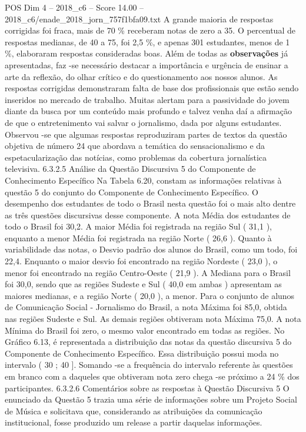 \begin{textsample}{POS Dim 4 – 2018\_c6 – Score 14.00 – 2018\_c6/enade\_2018\_jorn\_757f1bfa09.txt}
A grande maioria de respostas corrigidas foi fraca, mais de 70 \% receberam notas de zero a 35.
O percentual de respostas medianas, de 40 a 75, foi 2,5 \%, e apenas 301 estudantes, menos de 1 \%, elaboraram respostas consideradas boas.
Além de todas as \textbf{observações} já apresentadas, faz -se necessário destacar a importância e urgência de ensinar a arte da reflexão, do olhar crítico e do questionamento aos nossos alunos.
As respostas corrigidas demonstraram falta de base dos profissionais que estão sendo inseridos no mercado de trabalho.
Muitas alertam para a passividade do jovem diante da busca por um conteúdo mais profundo e talvez venha daí a afirmação de que o entretenimento vai salvar o jornalismo, dada por alguns estudantes.
Observou -se que algumas respostas reproduziram partes de textos da questão objetiva de número 24 que abordava a temática do sensacionalismo e da espetacularização das notícias, como problemas da cobertura jornalística televisiva. 6.3.2.5 Análise da Questão Discursiva 5 do Componente de Conhecimento Específico Na Tabela 6.20, constam as informações relativas à questão 5 do conjunto do Componente de Conhecimento Específico.
O desempenho dos estudantes de todo o Brasil nesta questão foi o mais alto dentre as três questões discursivas desse componente.
A nota Média dos estudantes de todo o Brasil foi 30,2.
A maior Média foi registrada na região Sul ( 31,1 ), enquanto a menor Média foi registrada na região Norte ( 26,6 ).
Quanto à variabilidade das notas, o Desvio padrão dos alunos do Brasil, como um todo, foi 22,4.
Enquanto o maior desvio foi encontrado na região Nordeste ( 23,0 ), o menor foi encontrado na região Centro-Oeste ( 21,9 ).
A Mediana para o Brasil foi 30,0, sendo que as regiões Sudeste e Sul ( 40,0 em ambas ) apresentam as maiores medianas, e a região Norte ( 20,0 ), a menor.
Para o conjunto de alunos de Comunicação Social - Jornalismo do Brasil, a nota Máxima foi 85,0, obtida nas regiões Sudeste e Sul.
As demais regiões obtiveram nota Máxima 75,0.
A nota Mínima do Brasil foi zero, o mesmo valor encontrado em todas as regiões.
No Gráfico 6.13, é representada a distribuição das notas da questão discursiva 5 do Componente de Conhecimento Específico.
Essa distribuição possui moda no intervalo ( 30 ; 40 ].
Somando -se a frequência do intervalo referente às questões em branco com a daqueles que obtiveram nota zero chega -se próximo a 24 \% dos participantes. 6.3.2.6 Comentários sobre as respostas à Questão Discursiva 5 O enunciado da Questão 5 trazia uma série de informações sobre um Projeto Social de Música e solicitava que, considerando as atribuições da comunicação institucional, fosse produzido um release a partir daquelas informações.

\end{textsample}
